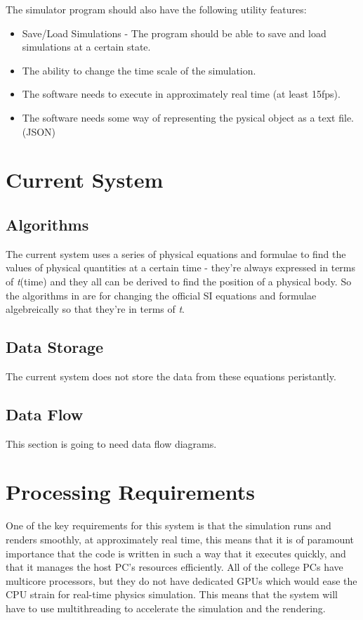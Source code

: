 The simulator program should also have the following utility features:
\begin{itemize}
	\item Save/Load Simulations - The program should be able to save and load simulations at a certain state.
	\item The ability to change the time scale of the simulation.
	\item The software needs to execute in approximately real time (at least 15fps).
	\item The software needs some way of representing the pysical object as a text file. (JSON)

\end{itemize}

\section{Current System}

	\subsection{Algorithms}
		The current system uses a series of physical equations and formulae to find the values of physical quantities at a certain time - they're always expressed in terms of \textit{t}(time) and they all can be derived to find the position of a physical body. So the algorithms in are for changing the official SI equations and formulae algebreically so that they're in terms of \textit{t}.
		
	\subsection{Data Storage}
		The current system does not store the data from these equations peristantly.

	\subsection{Data Flow}
		This section is going to need data flow diagrams.


\section{Processing Requirements}
One of the key requirements for this system is that the simulation runs and renders smoothly, at approximately real time, this means that it is of paramount importance that the code is written in such a way that it executes quickly, and that it manages the host PC's resources efficiently. All of the college PCs have multicore processors, but they do not have dedicated GPUs which would ease the CPU strain for real-time physics simulation. This means that the system will have to use multithreading to accelerate the simulation and the rendering.

